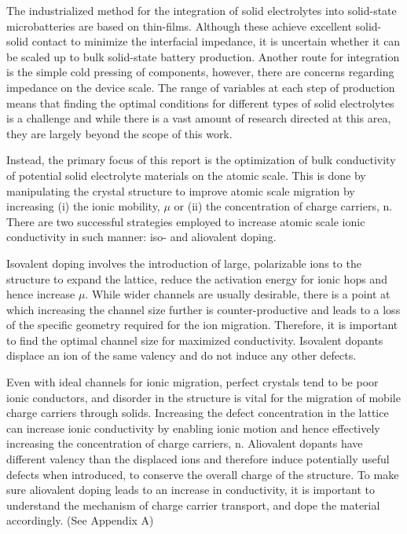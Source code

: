 \documentclass[12pt]{report}
\begin{document}
The industrialized method for the integration of solid electrolytes into solid-state microbatteries are based on thin-films.
Although these achieve excellent solid-solid contact to minimize the interfacial impedance, it is uncertain whether it can be scaled up to bulk solid-state battery production.
Another route for integration is the simple cold pressing of components, however, there are concerns regarding impedance on the device scale.\cite{famprikis2019}
The range of variables at each step of production means that finding the optimal conditions for different types of solid electrolytes is a challenge and while there is a vast amount of research directed at this area,\cite{he2021} they are largely beyond the scope of this work.

Instead, the primary focus of this report is the optimization of bulk conductivity of potential solid electrolyte materials on the atomic scale.
This is done by manipulating the crystal structure to improve atomic scale migration by increasing (i) the ionic mobility, $\mu$ or (ii) the concentration of charge carriers, n.
There are two successful strategies employed to increase atomic scale ionic conductivity in such manner: iso- and aliovalent doping.

Isovalent doping involves the introduction of large, polarizable ions to the structure to expand the lattice, reduce the activation energy for ionic hops and hence increase $\mu$.
While wider channels are usually desirable, there is a point at which increasing the channel size further is counter-productive and leads to a loss of the specific geometry required for the ion migration.
Therefore, it is important to find the optimal channel size for maximized conductivity.
Isovalent dopants displace an ion of the same valency and do not induce any other defects.

Even with ideal channels for ionic migration, perfect crystals tend to be poor ionic conductors, and disorder in the structure is vital for the migration of mobile charge carriers through solids.
Increasing the defect concentration in the lattice can increase ionic conductivity by enabling ionic motion and hence effectively increasing the concentration of charge carriers, n.
Aliovalent dopants have different valency than the displaced ions and therefore induce potentially useful defects when introduced, to conserve the overall charge of the structure.
To make sure aliovalent doping leads to an increase in conductivity, it is important to understand the mechanism of charge carrier transport, and dope the material accordingly.\cite{bachman2016} (See Appendix A)
\end{document}
